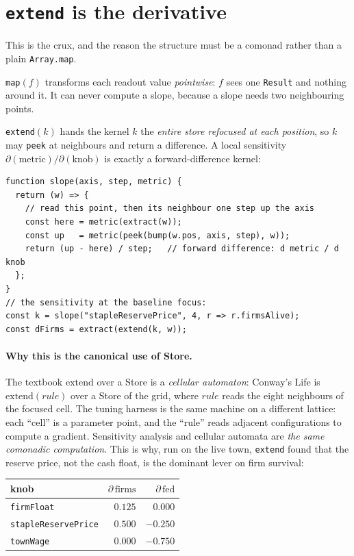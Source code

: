 \documentclass[11pt]{article}
\begin{document}
\section{\texttt{extend} is the derivative}

This is the crux, and the reason the structure must be a comonad rather than a
plain \texttt{Array.map}.

\texttt{map}$(f)$ transforms each readout value \emph{pointwise}: $f$ sees one
\texttt{Result} and nothing around it. It can never compute a slope, because a
slope needs two neighbouring points.

\texttt{extend}$(k)$ hands the kernel $k$ the \emph{entire store refocused at
each position}, so $k$ may \texttt{peek} at neighbours and return a difference.
A local sensitivity $\partial(\text{metric})/\partial(\text{knob})$ is exactly a
forward-difference kernel:

\begin{lstlisting}
function slope(axis, step, metric) {
  return (w) => {
    // read this point, then its neighbour one step up the axis
    const here = metric(extract(w));
    const up   = metric(peek(bump(w.pos, axis, step), w));
    return (up - here) / step;   // forward difference: d metric / d knob
  };
}
// the sensitivity at the baseline focus:
const k = slope("stapleReservePrice", 4, r => r.firmsAlive);
const dFirms = extract(extend(k, w));
\end{lstlisting}

\paragraph{Why this is the canonical use of Store.} The textbook $\mathrm{extend}$
over a Store is a \emph{cellular automaton}: Conway's Life is
$\mathrm{extend}(\mathit{rule})$ over a Store of the grid, where $\mathit{rule}$
reads the eight neighbours of the focused cell. The tuning harness is the same
machine on a different lattice: each ``cell'' is a parameter point, and the
``rule'' reads adjacent configurations to compute a gradient. Sensitivity
analysis and cellular automata are \emph{the same comonadic computation}. This is
why, run on the live town, \texttt{extend} found that the reserve price, not the
cash float, is the dominant lever on firm survival:

\begin{center}
\begin{tabular}{@{}lrr@{}}
\toprule
knob & $\partial\,\text{firms}$ & $\partial\,\text{fed}$ \\
\midrule
\texttt{firmFloat}          & $0.125$ & $0.000$ \\
\texttt{stapleReservePrice} & $\mathbf{0.500}$ & $-0.250$ \\
\texttt{townWage}           & $0.000$ & $-0.750$ \\
\bottomrule
\end{tabular}
\end{center}
\end{document}
